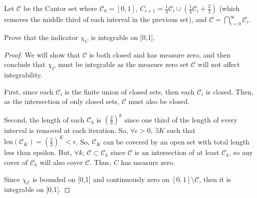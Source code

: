 \documentclass[../hw7]{subfiles}
\begin{document}
\begin{problem}[2]
Let $\mathcal{C}$ be the Cantor set where $\mathcal{C}_0=[0,1]$, $C_{i + 1} = \frac{1}{3}\mathcal{C}_i \cup \left( \frac{1}{3} \mathcal{C}_i + \frac{2}{3}\right)$ (which removes the middle third of each interval in the previous set), and $\mathcal{C}=\bigcap_{i=0}^{\infty} \mathcal{C}_i$.

Prove that the indicator $\chi_C$ is integrable on [0,1].
\end{problem}
\begin{proof}
	We will show that $\mathcal{C}$ is both closed and has measure zero, and then conclude that $\chi_{\mathcal{C}}$ must be integrable as the measure zero set $\mathcal{C}$ will not affect integrability.

	First, since each $\mathcal{C}_i$ is the finite union of closed sets, then each $\mathcal{C}_i$ is closed.
	Then, as the intersection of only closed sets,  $\mathcal{C}$ must also be closed.

	Second, the length of each $\mathcal{C}_k$ is ${\left( \frac{2}{3} \right)}^k$ since one third of the length of every interval is removed at each iteration.
	So, $\forall \epsilon>0,\, \exists K$ such that $\text{len}(\mathcal{C}_K)={\left( \frac{2}{3} \right) }^K<\epsilon$.
	So, $\mathcal{C}_K$ can be covered by an open set with total length less than epsilon.
	But, $\forall k,\, \mathcal{C}\subset \mathcal{C}_k$ since $\mathcal{C}$ is an intersection of at least $\mathcal{C}_k$,
	so any cover of $\mathcal{C}_k$ will also cover  $\mathcal{C}$.
	Thus, $C$ has measure zero.


	Since $\chi_{\mathcal{C}}$ is bounded on [0,1] and continuously zero on $[0,1]\setminus \mathcal{C}$, then it is integrable on [0,1].
\end{proof}
\end{document}
